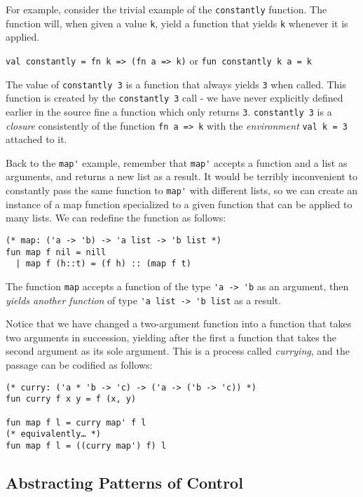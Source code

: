 \documentclass[11pt]{article}
\begin{document}
For example, consider the trivial example of the \verb~constantly~ function. The function will, when given a value \verb~k~, yield a function that yields \verb~k~ whenever it is applied.

\verb~val constantly = fn k => (fn a => k)~ or \verb~fun constantly k a = k~

The value of \verb~constantly 3~ is a function that always yields \verb~3~ when called. This function is created by the \verb~constantly 3~ call - we have never explicitly defined earlier in the source fine a function which only returns \verb~3~. \verb~constantly 3~ is a \emph{closure} consistently of the function \verb~fn a => k~ with the \emph{environment} \verb~val k = 3~ attached to it.

Back to the \verb~map'~ example, remember that \verb~map'~ accepts a function and a list as arguments, and returns a new list as a result. It would be terribly inconvenient to constantly pass the same function to \verb~map'~ with different lists, so we can create an instance of a map function specialized to a given function that can be applied to many lists. We can redefine the function as follows:

\begin{verbatim}
(* map: ('a -> 'b) -> 'a list -> 'b list *)
fun map f nil = nill
  | map f (h::t) = (f h) :: (map f t)
\end{verbatim}

The function \verb~map~ accepts a function of the type \verb#'a -> 'b# as an argument, then \emph{yields another function} of type \verb#'a list -> 'b list# as a result.

Notice that we have changed a two-argument function into a function that takes two arguments in succession, yielding after the first a function that takes the second argument as its sole argument. This is a process called \emph{currying}, and the passage can be codified as follows:

\begin{verbatim}
(* curry: ('a * 'b -> 'c) -> ('a -> ('b -> 'c)) *)
fun curry f x y = f (x, y)

fun map f l = curry map' f l 
(* equivalently… *)
fun map f l = ((curry map') f) l
\end{verbatim}



\subsection{Abstracting Patterns of Control}
\end{document}
